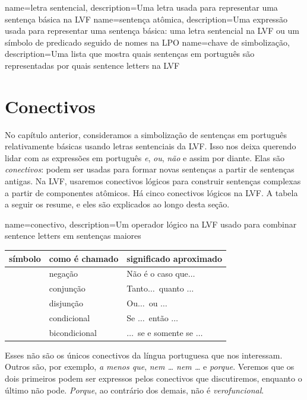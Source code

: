 {
name=letra sentencial,
description={Uma letra usada para representar uma sentença básica na LVF}
}
{
name=sentença atômica,
description={Uma expressão usada para representar uma sentença básica: uma letra sentencial na LVF ou um símbolo de predicado seguido de nomes na LPO}
}
{
name=chave de simbolização,
description={Uma lista que mostra quais sentenças em português são representadas por quais \glspl{sentence letter} na LVF}
}
\chapter{Conectivos}
\label{s:TFLConnectives}

No capítulo anterior, consideramos a simbolização de sentenças em
português relativamente básicas usando letras sentenciais da LVF. Isso
nos deixa querendo lidar com as expressões em português \emph{e},
\emph{ou}, \emph{não} e assim por diante. Elas são \emph{conectivos}:
podem ser usadas para formar novas sentenças a partir de sentenças
antigas. Na LVF, usaremos conectivos lógicos para construir sentenças
complexas a partir de componentes atômicos. Há cinco conectivos lógicos
na LVF. A tabela a seguir os resume, e eles são explicados ao longo
desta seção.

{
name=conectivo,
description={Um operador lógico na LVF usado para combinar \glspl{sentence letter} em sentenças maiores}
}
	\begin{table}[h]
	\centering
	\begin{tabular}{l l l}
	
	\textbf{símbolo}&\textbf{como é chamado}&\textbf{significado aproximado}\\
	\hline
	\enot&negação&Não é o caso que$\ldots$\\
	\eand&conjunção&Tanto$\ldots$\ quanto $\ldots$\\
	\eor&disjunção&Ou$\ldots$\ ou $\ldots$\\
	\eif&condicional&Se $\ldots$\ então $\ldots$\\
	\eiff&bicondicional&$\ldots$\ se e somente se $\ldots$\\
	
	\end{tabular}
	\end{table}

Esses não são os únicos conectivos da língua portuguesa que nos
interessam. Outros são, por exemplo, \emph{a menos que}, \emph{nem
\dots{} nem \dots} e \emph{porque}. Veremos que os dois primeiros podem
ser expressos pelos conectivos que discutiremos, enquanto o último não
pode. \emph{Porque}, ao contrário dos demais, não é
\emph{verofuncional}.


